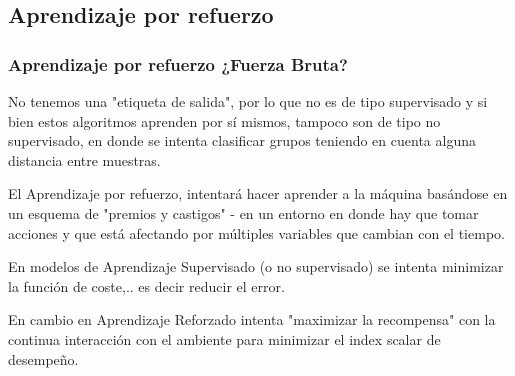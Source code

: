 \documentclass[
	11pt, %
]{beamer}
\begin{document}
\subsection{Aprendizaje por refuerzo}
\begin{frame}
  \frametitle{Aprendizaje por refuerzo ¿Fuerza Bruta?}
  
  No tenemos una "etiqueta de salida", por lo que no es de tipo supervisado y si bien estos algoritmos aprenden por sí mismos, tampoco son de tipo no supervisado, en donde se intenta clasificar grupos teniendo en cuenta alguna distancia entre muestras.

  \bigskip %

  El Aprendizaje por refuerzo, intentará hacer aprender a la máquina basándose en un esquema de "premios y castigos" - en un entorno en donde hay que tomar acciones y que está afectando por múltiples variables que cambian con el tiempo.

  \bigskip %

  En modelos de Aprendizaje Supervisado (o no supervisado) se intenta minimizar la función de coste,.. es decir reducir el error.

  \bigskip %

  En cambio en Aprendizaje Reforzado intenta "maximizar la recompensa" con la continua interacción con el ambiente para minimizar el index scalar de desempeño.

\end{frame}
\end{document}
